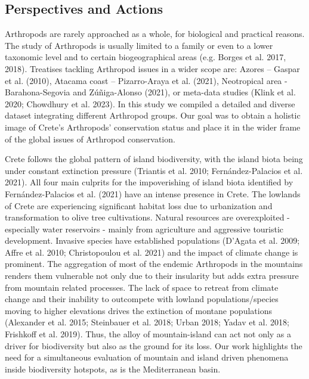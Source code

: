     \subsection{Perspectives and Actions}
    \label{subsec:arthropods-perspectives-actions}

Arthropods are rarely approached as a whole, for biological and practical
reasons. The study of Arthropods is usually limited to a family or even to a
lower taxonomic level and to certain biogeographical areas (e.g. Borges et al. 2017, 2018).
Treatises tackling Arthropod issues in a wider scope are: Azores – Gaspar et al. (2010),
Atacama coast – Pizarro-Araya et al. (2021), Neotropical area - Barahona-Segovia and Zúñiga-Alonso (2021),
or meta-data studies (Klink et al. 2020; Chowdhury et al. 2023). In this study
we compiled a detailed and diverse dataset integrating different Arthropod groups.
Our goal was to obtain a holistic image of Crete’s Arthropods’ conservation
status and place it in the wider frame of the global issues of Arthropod conservation.

Crete follows the global pattern of island biodiversity, with the island biota
being under constant extinction pressure (Triantis et al. 2010; Fernández-Palacios et al. 2021).
All four main culprits for the impoverishing of island biota identified by
Fernández-Palacios et al. (2021) have an intense presence in Crete. The
lowlands of Crete are experiencing significant habitat loss due to urbanization
and transformation to olive tree cultivations. Natural resources are
overexploited - especially water reservoirs - mainly from agriculture and
aggressive touristic development. Invasive species have established populations
(D'Agata et al. 2009; Affre et al. 2010; Christopoulou et al. 2021) and the
impact of climate change is prominent. The aggregation of most of the endemic
Arthropods in the mountains renders them vulnerable not only due to their
insularity but adds extra pressure from mountain related processes. The lack of
space to retreat from climate change and their inability to outcompete with
lowland populations/species moving to higher elevations drives the extinction
of montane populations (Alexander et al. 2015; Steinbauer et al. 2018; Urban 2018; Yadav et al. 2018; Frishkoff et al. 2019).
Thus, the alloy of mountain-island can act not only as a driver for
biodiversity but also as the ground for its loss. Our work highlights the need
for a simultaneous evaluation of mountain and island driven phenomena inside
biodiversity hotspots, as is the Mediterranean basin.

